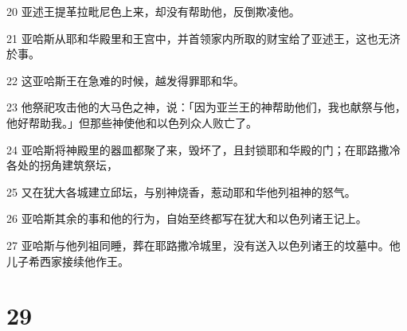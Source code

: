 \par 20 亚述王提革拉毗尼色上来，却没有帮助他，反倒欺凌他。
\par 21 亚哈斯从耶和华殿里和王宫中，并首领家内所取的财宝给了亚述王，这也无济於事。
\par 22 这亚哈斯王在急难的时候，越发得罪耶和华。
\par 23 他祭祀攻击他的大马色之神，说：「因为亚兰王的神帮助他们，我也献祭与他，他好帮助我。」但那些神使他和以色列众人败亡了。
\par 24 亚哈斯将神殿里的器皿都聚了来，毁坏了，且封锁耶和华殿的门；在耶路撒冷各处的拐角建筑祭坛，
\par 25 又在犹大各城建立邱坛，与别神烧香，惹动耶和华他列祖神的怒气。
\par 26 亚哈斯其余的事和他的行为，自始至终都写在犹大和以色列诸王记上。
\par 27 亚哈斯与他列祖同睡，葬在耶路撒冷城里，没有送入以色列诸王的坟墓中。他儿子希西家接续他作王。

\chapter{29}

